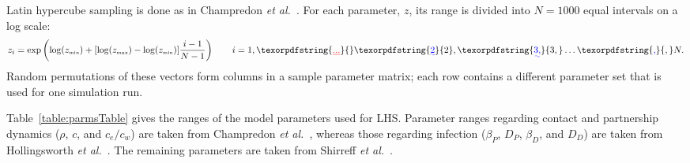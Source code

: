 \documentclass[10pt,letterpaper]{article}
\newcommand{\etal}{\textit{et al.}}
\newcommand{\tsub}[2]{#1_{{\textrm{\tiny #2}}}}
\providecommand{\DIFaddtex}[1]{{\protect\color{blue}\uwave{#1}}} %
\providecommand{\DIFdeltex}[1]{{\protect\color{red}\sout{#1}}}                      %
\providecommand{\DIFaddbegin}{} %
\providecommand{\DIFaddend}{} %
\providecommand{\DIFdelbegin}{} %
\providecommand{\DIFdelend}{} %
\providecommand{\DIFadd}[1]{\texorpdfstring{\DIFaddtex{#1}}{#1}} %
\providecommand{\DIFdel}[1]{\texorpdfstring{\DIFdeltex{#1}}{}} %
\newcommand{\DIFscaledelfig}{0.5}
\newlength{\DIFdelgraphicswidth} %
\newlength{\DIFdelgraphicsheight} %
\newcommand{\DIFaddincludegraphics}[2][]{{\color{blue}\fbox{\DIFOincludegraphics[#1]{#2}}}} %
\newcommand{\DIFdelincludegraphics}[2][]{%
\sbox{\DIFdelgraphicsbox}{\DIFOincludegraphics[#1]{#2}}%
\settoboxwidth{\DIFdelgraphicswidth}{\DIFdelgraphicsbox} %
\settoboxtotalheight{\DIFdelgraphicsheight}{\DIFdelgraphicsbox} %
\scalebox{\DIFscaledelfig}{%
\parbox[b]{\DIFdelgraphicswidth}{\usebox{\DIFdelgraphicsbox}\\[-\baselineskip] \rule{\DIFdelgraphicswidth}{0em}}\llap{\resizebox{\DIFdelgraphicswidth}{\DIFdelgraphicsheight}{%
\setlength{\unitlength}{\DIFdelgraphicswidth}%
\begin{picture}(1,1)%
\thicklines\linethickness{2pt} %
{\color[rgb]{1,0,0}\put(0,0){\framebox(1,1){}}}%
{\color[rgb]{1,0,0}\put(0,0){\line( 1,1){1}}}%
{\color[rgb]{1,0,0}\put(0,1){\line(1,-1){1}}}%
\end{picture}%
}\hspace*{3pt}}} %
} %
\DeclareRobustCommand{\DIFaddbegin}{\DIFOaddbegin \let\includegraphics\DIFaddincludegraphics} %
\DeclareRobustCommand{\DIFaddend}{\DIFOaddend \let\includegraphics\DIFOincludegraphics} %
\DeclareRobustCommand{\DIFdelbegin}{\DIFOdelbegin \let\includegraphics\DIFdelincludegraphics} %
\DeclareRobustCommand{\DIFdelend}{\DIFOaddend \let\includegraphics\DIFOincludegraphics} %
\begin{document}
Latin hypercube sampling is done as in Champredon \etal\ \cite{champredon_hiv_2013}. For each parameter, $z$, its range is divided into $N = 1000$ equal intervals on a log scale:
\begin{equation}
z_i = \exp\left(\log(\tsub{z}{min}) + [\log(\tsub{z}{max}) - \log(\tsub{z}{min})] \frac{i-1}{N-1}\right) \qquad i = 1, \DIFdelbegin \DIFdel{...}\DIFdelend \DIFaddbegin \DIFadd{2}\DIFaddend , \DIFaddbegin \DIFadd{3, }\dots\DIFadd{,}\DIFaddend N.
\end{equation}
Random permutations of these vectors form columns in a sample parameter matrix; each row contains a different parameter set that is used for one simulation run.

Table~\ref{table:parmsTable} gives the ranges of the model parameters used for LHS. Parameter ranges regarding contact and partnership dynamics ($\rho$, $c$, and $c_e/c_w$) are taken from Champredon \etal\ \cite{champredon_hiv_2013}, whereas those regarding infection ($\beta_P$, $D_P$, $\beta_D$, and $D_D$) are taken from Hollingsworth \etal\ \cite{hollingsworth_hiv1_2008}. The remaining parameters are taken from Shirreff \etal\ \cite{shirreff_transmission_2011}.

\end{document}

